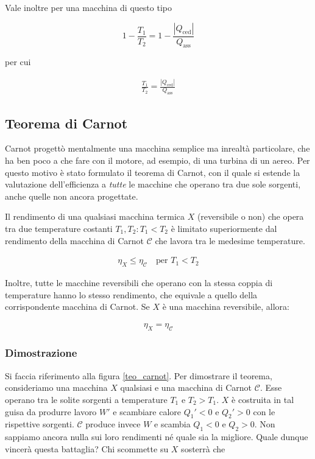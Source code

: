 Vale inoltre per una macchina di questo tipo

\[ 1 - \frac{T_1}{T_2} = 1 - \frac{|Q_\text{ced}|}{Q_\text{ass}} \]

\noindent per cui

\begin{align}
    \frac{T_1}{T_2} = \frac{|Q_\text{ced}|}{Q_\text{ass}}
\end{align}



\subsection{Teorema di Carnot}
Carnot progettò mentalmente una macchina semplice ma inrealtà
particolare, che ha ben poco a che fare con il motore, ad esempio,
di una turbina di un aereo. Per questo motivo è stato formulato
il teorema di Carnot, con il quale si estende la valutazione
dell'efficienza a \textit{tutte} le macchine che operano tra due
sole sorgenti, anche quelle non ancora progettate.


\begin{tcolorbox}[colback = red!30, colframe = red!30!black, title = {Teorema di Carnot}]
Il rendimento di una qualsiasi macchina termica $X$ (reversibile o non)
che opera tra due
temperature costanti $T_1,T_2: T_1 < T_2$ è limitato superiormente dal rendimento della
macchina di Carnot $\mathcal{C}$ che lavora tra le medesime temperature.

\begin{align}
    \eta_X \leq \eta_\mathcal{C} \quad \text{per } T_1 < T_2\label{carnot1}
\end{align}

Inoltre, tutte le macchine reversibili che operano con la stessa coppia di temperature
hanno lo stesso rendimento, che equivale a quello della corrispondente macchina di
Carnot. Se $X$ è una macchina reversibile, allora:

\begin{align}
    \eta_X = \eta_\mathcal{C}\label{carnot2}
\end{align}

\end{tcolorbox}


\subsubsection*{Dimostrazione}
Si faccia riferimento alla figura \ref{teo_carnot}.
Per dimostrare il teorema, consideriamo una macchina $X$ qualsiasi
e una macchina di Carnot $\mathcal{C}$. Esse operano tra le solite
sorgenti a temperature $T_1$ e $T_2 > T_1$.
$X$ è costruita in tal guisa da produrre lavoro $W'$ e scambiare
calore $Q_1' < 0$ e $Q_2' > 0$ con le rispettive sorgenti. $\mathcal{C}$
produce invece $W$ e scambia $Q_1 < 0$ e $Q_2 > 0$.
Non sappiamo ancora nulla sui loro rendimenti né quale sia la migliore.
Quale dunque vincerà questa battaglia?
Chi scommette su $X$ sosterrà che

